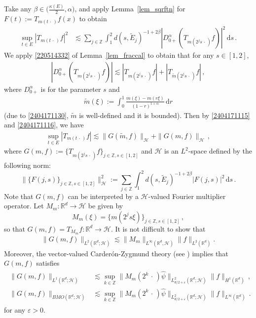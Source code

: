 \documentclass[11pt]{amsart}
\theoremstyle{plain}
\theoremstyle{definition}
\theoremstyle{remark}
\numberwithin{equation}{section}
\newcommand{\cH}{\mathcal{H}}
\newcommand{\bR}{\mathbb{R}}
\newcommand{\bZ}{\mathbb{Z}}
\newcommand{\dd}{\,\mathrm{d}}
\newcommand{\wt}{\widetilde}
\begin{document}
Take any $\beta\in \big(\frac{\kappa(E)}{2},\alpha\big)$, and apply Lemma~\ref{lem_sqrftn} for $F(t):=T_{m(t\,\cdot\,)}f(x)$ to obtain
\begin{align}\label{2404171115}
\sup_{t\in E}\left|T_{m(t\,\cdot\,)}f\right|^2&\lesssim \sum_{j\in\bZ}\int_1^2 d(s,\widetilde{E}_j)^{-1+2\beta}\left|D^\alpha_{0+}\left(T_{m(2^js\,\cdot\,)}f\right)\right|^2\dd s\,.
\end{align}
We apply \eqref{220514332} of Lemma~\ref{lem_fraccal} to obtain that for any $s\in[1,2]$, 
\begin{align}\label{2404171116}
\left|D^\alpha_{0+}\left(T_{m(2^js\,\cdot\,)}f\right)\right|\lesssim \left|T_{m(2^js\,\cdot\,)}f\right|+\left|T_{\wt{m}(2^js\,\cdot\,)}f\right|\,,
\end{align}
where $D^\alpha_{0+}$ is for the parameter $s$ and 
\begin{align}\label{2508291038}
\wt{m}(\xi):=\int_0^1\frac{m(\xi)-m(r\xi)}{(1-r)^{1+\alpha}}\dd r
\end{align}
(due to \eqref{2404171130}, $\wt{m}$ is well-defined and it is bounded).
Then by \eqref{2404171115} and \eqref{2404171116}, we have
\begin{align}\label{240422402}
\sup_{t\in E}\left|T_{m(t\,\cdot\,)}f\right|\lesssim \|G(\wt{m},f)\|_{\cH}+\|G(m,f)\|_{\cH}\,,
\end{align}
where $G(m,f):=\{T_{m(2^js\,\cdot\,)}f\}_{j\in\bZ,s\in [1,2]}$ and $\cH$ is an $L^2$-space defined by the following norm: 
$$
\big\|\big\{F(j,s)\big\}_{j\in\bZ,s\in[1,2]}\big\|_{\cH}^2:=\sum_{j\in\bZ}\int_1^2d(s,\widetilde{E}_j)^{-1+2\beta}|F(j,s)|^2\dd s\,.
$$
Note that $G(m,f)$ can be interpreted by a $\mathcal{H}$-valued Fourier multiplier operator.
Let $M_m:\bR^d\rightarrow \cH$ be given by
$$
M_m(\xi)=\{m(2^js\xi)\}_{j\in\bZ,s\in[1,2]}\,,
$$
so that $G(m,f)=T_{M_m}f:\bR^d\rightarrow \cH$.
It is not difficult to show that
\begin{align}\label{231228_1628}
    \| G(m,f) \|_{L^2(\bR^d;\mathcal{H})} 
    \lesssim 
    \|M_m\|_{L^\infty(\bR^d, \mathcal{H})} \|f\|_{L^2(\bR^d)}.
\end{align}
Moreover, the vector-valued Carder\'on-Zygmund theory (see \cite{Ru_Ru_To1986}) implies that $G(m,f)$ satisfies
\begin{align*}
\begin{split}
    \| G(m,f) \|_{L^1(\bR^d;\mathcal{H})}&\lesssim \sup_{k\in \bZ} \| M_m(2^k\,\cdot\,)\widehat{\psi}\|_{L_{d/2+\varepsilon}^2(\bR^d; \mathcal{H})} \|f\|_{H^1(\bR^d)}\,,\\
    \| G(m,f) \|_{BMO(\bR^d;\mathcal{H})}&\lesssim \sup_{k\in \bZ} \| M_m(2^k\,\cdot\,)\widehat{\psi}\|_{L_{d/2+\varepsilon}^2(\bR^d; \mathcal{H})}\|f\|_{L^\infty(\bR^d)}\,.
\end{split}
\end{align*}
for any $\varepsilon>0$. 
\end{document}
